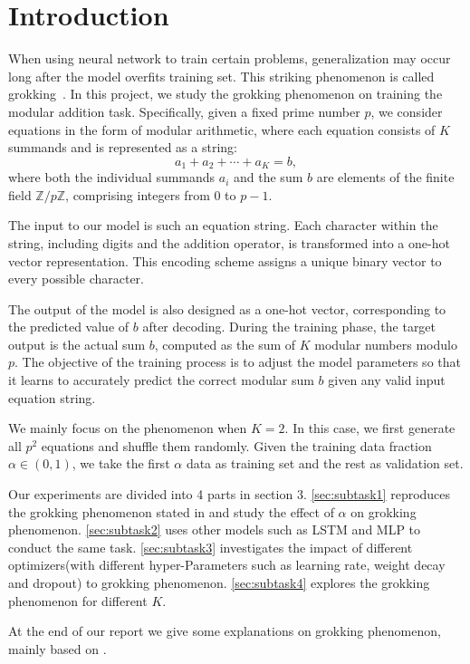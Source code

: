 \section{Introduction}
\label{sec:intro}
When using neural network to train certain problems, generalization may occur long after the model overfits training set. This striking phenomenon is called grokking~\cite{Grokking}. In this project, we study the grokking phenomenon on training the modular addition task. Specifically, given a fixed prime number $p$, we consider equations in the form of modular arithmetic, where each equation consists of $K$ summands and is represented as a string:
$$
a_{1} + a_{2} + \cdots + a_{K} = b,
$$
where both the individual summands $a_i$ and the sum $b$ are elements of the finite field $\mathbb{Z}/p\mathbb{Z}$, comprising integers from $0$ to $p-1$.

The input to our model is such an equation string. Each character within the string, including digits and the addition operator, is transformed into a one-hot vector representation. This encoding scheme assigns a unique binary vector to every possible character.

The output of the model is also designed as a one-hot vector, corresponding to the predicted value of $b$ after decoding. During the training phase, the target output is the actual sum $b$, computed as the sum of $K$ modular numbers modulo $p$. The objective of the training process is to adjust the model parameters so that it learns to accurately predict the correct modular sum $b$ given any valid input equation string.

We mainly focus on the phenomenon when $K=2$. In this case, we first generate all $p^2$ equations and shuffle them randomly. Given the training data fraction $\alpha\in(0,1)$, we take the first $\alpha$ data as training set and the rest as validation set.

Our experiments are divided into 4 parts in section 3. \ref{sec:subtask1} reproduces the grokking phenomenon stated in \cite{Grokking} and study the effect of $\alpha$ on grokking phenomenon. \ref{sec:subtask2} uses other models such as LSTM and MLP to conduct the same task. \ref{sec:subtask3} investigates the impact of different optimizers(with different hyper-Parameters such as learning rate, weight decay and dropout) to grokking phenomenon. \ref{sec:subtask4} explores the grokking phenomenon for different $K$.  

At the end of our report we give some explanations on grokking phenomenon, mainly based on \cite{JacotHG18}.

